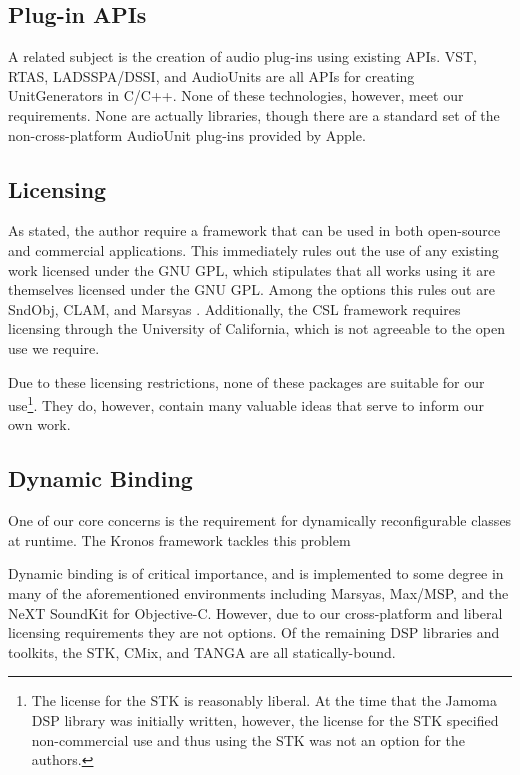 \documentclass[twoside,10pt]{article}
\begin{document}


\subsection{Plug-in APIs} %

A related subject is the creation of audio plug-ins using existing APIs.  VST, RTAS, LADSSPA/DSSI, and AudioUnits are all APIs for creating UnitGenerators in C/C++.  None of these technologies, however, meet our requirements.  None are actually libraries, though there are a standard set of the non-cross-platform AudioUnit plug-ins provided by Apple.



\subsection{Licensing} %

As stated, the author require a framework that can be used in both open-source and commercial applications.  This immediately rules out the use of any existing work licensed under the GNU GPL, which stipulates that all works using it are themselves licensed under the GNU GPL.  Among the options this rules out are SndObj\cite{Lazzarini:2001}, CLAM\cite{Amatraian:2008}, and Marsyas \cite{Tzanetakis:2008}.  Additionally, the CSL framework\cite{Pope:2003} requires licensing through the University of California, which is not agreeable to the open use we require.

Due to these licensing restrictions, none of these packages are suitable for our use\footnote{The license for the STK is reasonably liberal.  At the time that the Jamoma DSP library was initially written, however, the license for the STK specified non-commercial use and thus using the STK was not an option for the authors.  }.  They do, however, contain many valuable ideas that serve to inform our own work.



\subsection{Dynamic Binding} %

One of our core concerns is the requirement for dynamically reconfigurable classes at runtime.  The Kronos framework tackles this problem 

 


Dynamic binding is of critical importance, and is implemented to some degree in many of the aforementioned environments including Marsyas, Max/MSP, and the NeXT SoundKit for Objective-C.  However, due to our cross-platform and liberal licensing requirements they are not options.  Of the remaining DSP libraries and toolkits, the STK\cite{Cook:1999}, CMix\cite{Lansky:1990}, and TANGA\cite{Reiter:2007} are all statically-bound.  
\end{document}

